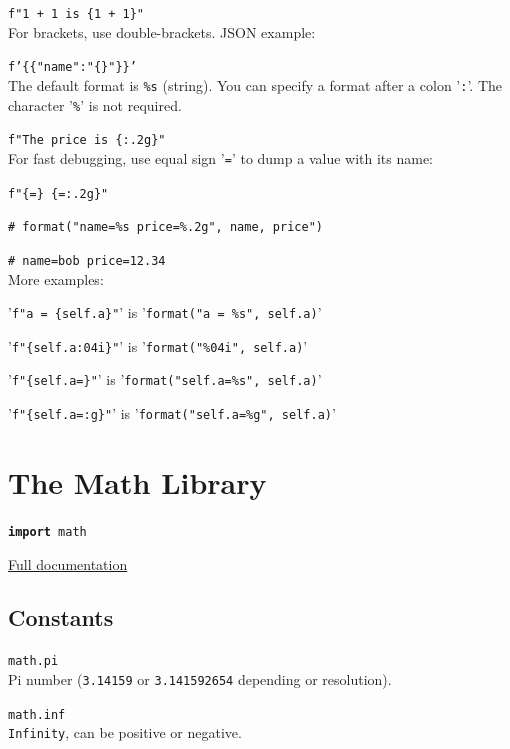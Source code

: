 \texttt{f"1 + 1 is \{1 + 1\}"}\\

\hangpar For brackets, use double-brackets. JSON example:

\texttt{f'\{\{"name":"\{}\texttt{\}"\}\}'}\\

\hangpar The default format is \texttt{\%s} (string). You can specify a format after a colon '\texttt{:}'. The character '\texttt{\%}' is not required.

\texttt{f"The price is \{}\texttt{:.2g\}"}\\

\hangpar For fast debugging, use equal sign '\texttt{=}' to dump a value with its name:

\texttt{f"\{}\texttt{=\} \{}\texttt{=:.2g\}"}

\texttt{\# format("name=\%s price=\%.2g", name, price")}

\texttt{\# name=bob price=12.34}\\

\hangpar More examples:

'\texttt{f"a = \{self.a\}"}' is  '\texttt{format("a = \%s", self.a)}'

'\texttt{f"\{self.a:04i\}"}' is  '\texttt{format("\%04i", self.a)}'

'\texttt{f"\{self.a=\}"}' is  '\texttt{format("self.a=\%s", self.a)}'

'\texttt{f"\{self.a=:g\}"}' is  '\texttt{format("self.a=\%g", self.a)}'

\section*{The Math Library}

\hangpar \texttt{\textbf{import} math}

\hangpar \href{https://berry.readthedocs.io/en/latest/source/en/Chapter-7.html\#math-module}{Full documentation}

\subsection*{Constants}

\hangpar \texttt{math.pi}\\
Pi number (\texttt{3.14159} or \texttt{3.141592654} depending or resolution).

\hangpar \texttt{math.inf}\\
\texttt{Infinity}, can be positive or negative.

